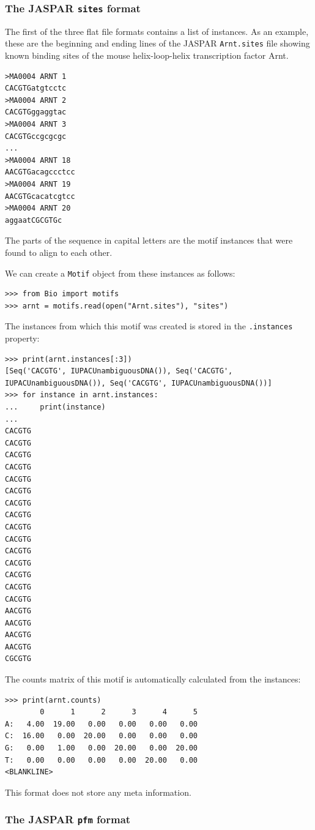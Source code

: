 \documentclass{report}
\begin{document}
\subsubsection*{The JASPAR \texttt{sites} format}

The first of the three flat file formats contains a list of instances. As an example, these are the beginning and ending lines of the JASPAR \verb+Arnt.sites+ file showing known binding sites of the mouse helix-loop-helix transcription factor Arnt.
\begin{verbatim}
>MA0004 ARNT 1
CACGTGatgtcctc
>MA0004 ARNT 2
CACGTGggaggtac
>MA0004 ARNT 3
CACGTGccgcgcgc
...
>MA0004 ARNT 18
AACGTGacagccctcc
>MA0004 ARNT 19
AACGTGcacatcgtcc
>MA0004 ARNT 20
aggaatCGCGTGc
\end{verbatim}
The parts of the sequence in capital letters are the motif instances that were found to align to each other.

We can create a \verb+Motif+ object from these instances as follows:
\begin{verbatim}
>>> from Bio import motifs
>>> arnt = motifs.read(open("Arnt.sites"), "sites")
\end{verbatim}
The instances from which this motif was created is stored in the \verb+.instances+ property:
\begin{verbatim}
>>> print(arnt.instances[:3])
[Seq('CACGTG', IUPACUnambiguousDNA()), Seq('CACGTG', IUPACUnambiguousDNA()), Seq('CACGTG', IUPACUnambiguousDNA())]
>>> for instance in arnt.instances:
...     print(instance)
...
CACGTG
CACGTG
CACGTG
CACGTG
CACGTG
CACGTG
CACGTG
CACGTG
CACGTG
CACGTG
CACGTG
CACGTG
CACGTG
CACGTG
CACGTG
AACGTG
AACGTG
AACGTG
AACGTG
CGCGTG
\end{verbatim}
The counts matrix of this motif is automatically calculated from the instances:
\begin{verbatim}
>>> print(arnt.counts)
        0      1      2      3      4      5
A:   4.00  19.00   0.00   0.00   0.00   0.00
C:  16.00   0.00  20.00   0.00   0.00   0.00
G:   0.00   1.00   0.00  20.00   0.00  20.00
T:   0.00   0.00   0.00   0.00  20.00   0.00
<BLANKLINE>
\end{verbatim}
This format does not store any meta information.

\subsubsection*{The JASPAR \texttt{pfm} format}
\end{document}
